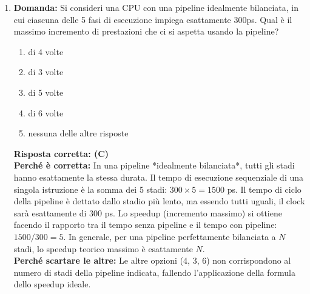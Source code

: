 \documentclass[12pt, a4paper]{article}
\begin{document}
\begin{enumerate}
    \item \textbf{Domanda:} Si consideri una CPU con una pipeline idealmente bilanciata, in cui ciascuna delle 5 fasi di esecuzione impiega esattamente 300ps. Qual è il massimo incremento di prestazioni che ci si aspetta usando la pipeline?
    \begin{enumerate}[label=(\Alph*)]
        \item di 4 volte
        \item di 3 volte
        \item di 5 volte
        \item di 6 volte
        \item nessuna delle altre risposte
    \end{enumerate}
    \textbf{Risposta corretta: (C)} \\
    \textbf{Perché è corretta:} In una pipeline *idealmente bilanciata*, tutti gli stadi hanno esattamente la stessa durata. Il tempo di esecuzione sequenziale di una singola istruzione è la somma dei 5 stadi: $300 \times 5 = 1500$ ps. Il tempo di ciclo della pipeline è dettato dallo stadio più lento, ma essendo tutti uguali, il clock sarà esattamente di $300$ ps. Lo speedup (incremento massimo) si ottiene facendo il rapporto tra il tempo senza pipeline e il tempo con pipeline: $1500 / 300 = 5$. In generale, per una pipeline perfettamente bilanciata a $N$ stadi, lo speedup teorico massimo è esattamente $N$. \\
    \textbf{Perché scartare le altre:} Le altre opzioni (4, 3, 6) non corrispondono al numero di stadi della pipeline indicata, fallendo l'applicazione della formula dello speedup ideale.


\end{enumerate}
\end{document}
